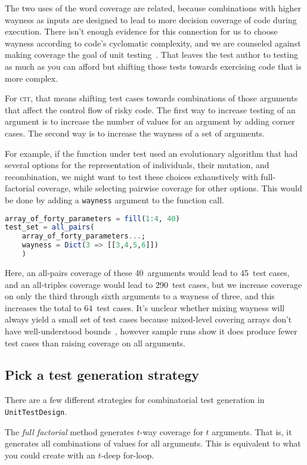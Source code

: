 \documentclass{juliacon}
\newcommand{\utd}{\texttt{UnitTestDesign}\xspace}
\newcommand{\cit}{\textsc{cit}\xspace}
\begin{document}
\vskip 6pt
The two uses of the word coverage are related, because combinations with higher wayness as inputs are designed to lead to more decision coverage of code during execution. There isn't enough evidence for this connection for us to choose wayness according to code's cyclomatic complexity, and we are counseled against making coverage the goal of unit testing~\cite{Inozemtseva2014-gz}. That leaves the test author to testing as much as you can afford but shifting those tests towards exercising code that is more complex.

\vskip 6pt
For \cit, that means shifting test cases towards combinations of those arguments that affect the control flow of risky code. The first way to increase testing of an argument is to increase the number of values for an argument by adding corner cases. The second way is to increase the wayness of a set of arguments.

\vskip 6pt
For example, if the function under test used an evolutionary algorithm that had several options for the representation of individuals, their mutation, and recombination, we might want to test these choices exhaustively with full-factorial coverage, while selecting pairwise coverage for other options. This would be done by adding a \verb|wayness| argument to the function call.
\begin{lstlisting}[language=Julia]
array_of_forty_parameters = fill(1:4, 40)
test_set = all_pairs(
    array_of_forty_parameters...;
    wayness = Dict(3 => [[3,4,5,6]])
    )
\end{lstlisting}
Here, an all-pairs coverage of these 40~arguments would lead to 45~test cases, and an all-triples coverage would lead to 290~test cases, but we increase coverage on only the third through sixth arguments to a wayness of three, and this increases the total to 64~test cases. It's unclear whether mixing wayness will always yield a small set of test cases because mixed-level covering arrays don't have well-understood bounds~\cite{Cohen2003-pg}, however sample runs show it does produce fewer test cases than raising coverage on all arguments.


\subsection{Pick a test generation strategy}

There are a few different strategies for combinatorial test generation in \utd.

\vskip 6pt
The \emph{full factorial} method generates $t$-way coverage for $t$ arguments. That is, it generates all combinations of values for all arguments. This is equivalent to what you could create with an $t$-deep for-loop.
\end{document}
